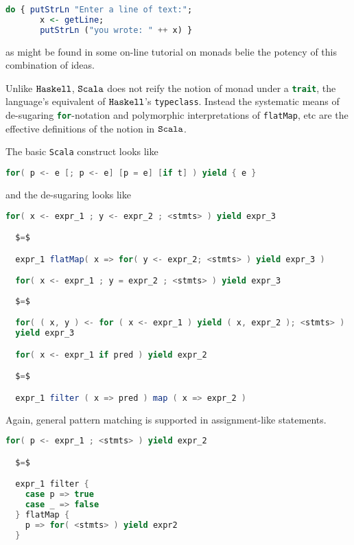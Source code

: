 \begin{lstlisting}[language=Haskell]
  do { putStrLn "Enter a line of text:";
       x <- getLine;
       putStrLn ("you wrote: " ++ x) }
\end{lstlisting}

as might be found in some on-line tutorial on monads belie the potency
of this combination of ideas.

Unlike $\texttt{Haskell}$, $\texttt{Scala}$ does not reify the notion of monad under a
\lstinline[language=Scala]!trait!, the language's equivalent of
$\texttt{Haskell}$'s \lstinline[language=Haskell]!typeclass!. Instead the
systematic means of de-sugaring
\lstinline[language=Scala]!for!-notation and polymorphic
interpretations of \lstinline[language=Scala]!flatMap!, etc are the
effective definitions of the notion in $\texttt{Scala}$.

The basic \texttt{Scala} construct looks like

\begin{lstlisting}[language=Scala]
  for( p <- e [; p <- e] [p = e] [if t] ) yield { e }
\end{lstlisting}

and the de-sugaring looks like

\begin{lstlisting}[language=Scala,mathescape=true]
  for( x <- expr_1 ; y <- expr_2 ; <stmts> ) yield expr_3

  $=$

  expr_1 flatMap( x => for( y <- expr_2; <stmts> ) yield expr_3 )

  for( x <- expr_1 ; y = expr_2 ; <stmts> ) yield expr_3
  
  $=$

  for( ( x, y ) <- for ( x <- expr_1 ) yield ( x, expr_2 ); <stmts> )
  yield expr_3

  for( x <- expr_1 if pred ) yield expr_2 

  $=$

  expr_1 filter ( x => pred ) map ( x => expr_2 )    
\end{lstlisting}

Again, general pattern matching is supported in assignment-like statements.

\begin{lstlisting}[language=Scala,mathescape=true]
  for( p <- expr_1 ; <stmts> ) yield expr_2 

  $=$

  expr_1 filter {
    case p => true
    case _ => false
  } flatMap {
    p => for( <stmts> ) yield expr2
  }
\end{lstlisting}

